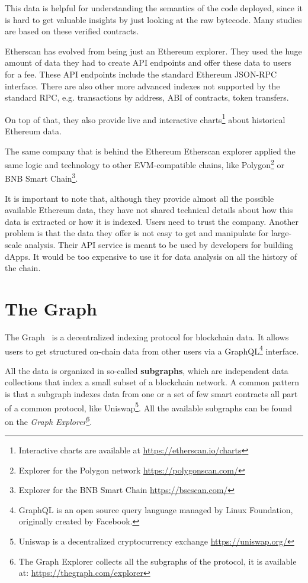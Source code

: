 This data is helpful for understanding the semantics of the code deployed, since it is hard to get valuable insights by just looking at the raw bytecode. Many studies are based on these verified contracts.

Etherscan has evolved from being just an Ethereum explorer. They used the huge amount of data they had to create API endpoints and offer these data to users for a fee. These API endpoints include the standard Ethereum JSON-RPC interface. There are also other more advanced indexes not supported by the standard RPC, e.g. transactions by address, ABI of contracts, token transfers.

On top of that, they also provide live and interactive charts\footnote{Interactive charts are available at \url{https://etherscan.io/charts}} about historical Ethereum data.

The same company that is behind the Ethereum Etherscan explorer applied the same logic and technology to other EVM-compatible chains, like Polygon\footnote{Explorer for the Polygon network \url{https://polygonscan.com/}} or BNB Smart Chain\footnote{Explorer for the BNB Smart Chain \url{https://bscscan.com/}}.

It is important to note that, although they provide almost all the possible available Ethereum data, they have not shared technical details about how this data is extracted or how it is indexed. Users need to trust the company. Another problem is that the data they offer is not easy to get and manipulate for large-scale analysis. Their API service is meant to be used by developers for building dApps. It would be too expensive to use it for data analysis on all the history of the chain. 

\section{The Graph}

The Graph~\cite{the-graph} is a decentralized indexing protocol for blockchain data. It allows users to get structured on-chain data from other users via a GraphQL\footnote{GraphQL is an open source query language managed by Linux Foundation, originally created by Facebook.} interface. 

All the data is organized in so-called \textbf{subgraphs}, which are independent data collections that index a small subset of a blockchain network. A common pattern is that a subgraph indexes data from one or a set of few smart contracts all part of a common protocol, like Uniswap\footnote{Uniswap is a decentralized cryptocurrency exchange \url{https://uniswap.org/}}. All the available subgraphs can be found on the \textit{Graph Explorer}\footnote{The Graph Explorer collects all the subgraphs of the protocol, it is available at: \url{https://thegraph.com/explorer}}.

